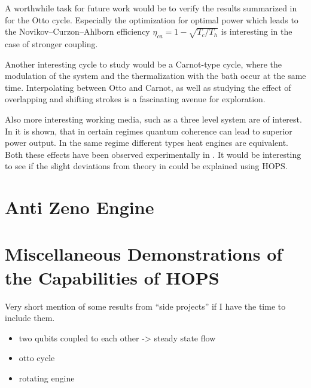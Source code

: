 A worthwhile task for future work would be to verify the results
summarized in \cite{Binder2018} for the Otto cycle. Especially the
optimization for optimal power which leads to the
Novikov–Curzon–Ahlborn efficiency \(η_{ca}=1-\sqrt{T_{c}/T_{h}}\) is
interesting in the case of stronger coupling.

Another interesting cycle to study would be a Carnot-type cycle, where
the modulation of the system and the thermalization with the bath
occur at the same time. Interpolating between Otto and Carnot, as well
as studying the effect of overlapping and shifting strokes is a
fascinating avenue for exploration.

Also more interesting working media, such as a three level system are
of interest. In \cite{Uzdin2015Sep} it is shown, that in certain
regimes quantum coherence can lead to superior power output. In the
same regime different types heat engines are equivalent. Both these
effects have been observed experimentally in \cite{Klatzow2019Mar}. It
would be interesting to see if the slight deviations from theory in
\cite{Klatzow2019Mar} could be explained using HOPS.


\newpage
\section{Anti Zeno Engine}
\label{sec:antizeno}


\section{Miscellaneous Demonstrations of the Capabilities of HOPS}
\label{sec:miscdemo}
Very short mention of some results from ``side projects'' if I have
the time to include them.

\begin{itemize}
\item two qubits coupled to each other -> steady state flow
\item otto cycle
\item rotating engine
\end{itemize}

